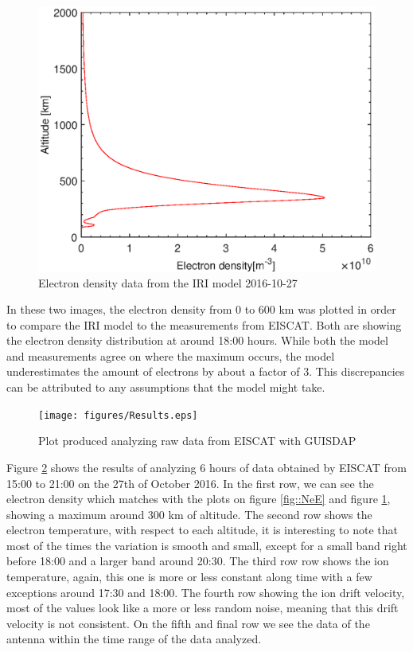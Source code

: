 \begin{minipage}{0.45\textwidth}
	\begin{flushright}
	\begin{figure}[H]
	\centering
	\includegraphics[width=\textwidth]{figures/NeIRI.eps}
	\caption{Electron density data from the IRI model 2016-10-27}
	\label{fig::NeIRI1}
	\end{figure}
	\end{flushright}
\end{minipage}

In these two images, the electron density from 0 to 600 km was plotted in order to compare the IRI model to the measurements from EISCAT. Both are showing the electron density distribution at around 18:00 hours. While both the model and measurements agree on where the maximum occurs, the model underestimates the amount of electrons by about a factor of 3. This discrepancies can be attributed to any assumptions that the model might take.

\begin{figure}[H]
	\centering
	\texttt{[image: figures/Results.eps]}
	\caption{Plot produced analyzing raw data from EISCAT with GUISDAP}
	\label{fig::resultsE1}
\end{figure}

Figure \ref{fig::resultsE1} shows the results of analyzing 6 hours of data obtained by EISCAT from 15:00  to 21:00 on the 27th of October 2016. In the first row, we can see the electron density which matches with the plots on figure \ref{fig::NeE} and figure \ref{fig::NeIRI1}, showing a maximum around 300 km of altitude. The second row shows the electron temperature, with respect to each altitude, it is interesting to note that most of the times the variation is smooth and small, except for a small band right before 18:00 and a larger band around 20:30. The third row row shows the ion temperature, again, this one is more or less constant along time with a few exceptions around 17:30 and 18:00. The fourth row showing the ion drift velocity,  most of the values look like a more or less random noise, meaning that this drift velocity is not consistent. On the fifth and final row we see the data of the antenna  within the time range of the data analyzed.